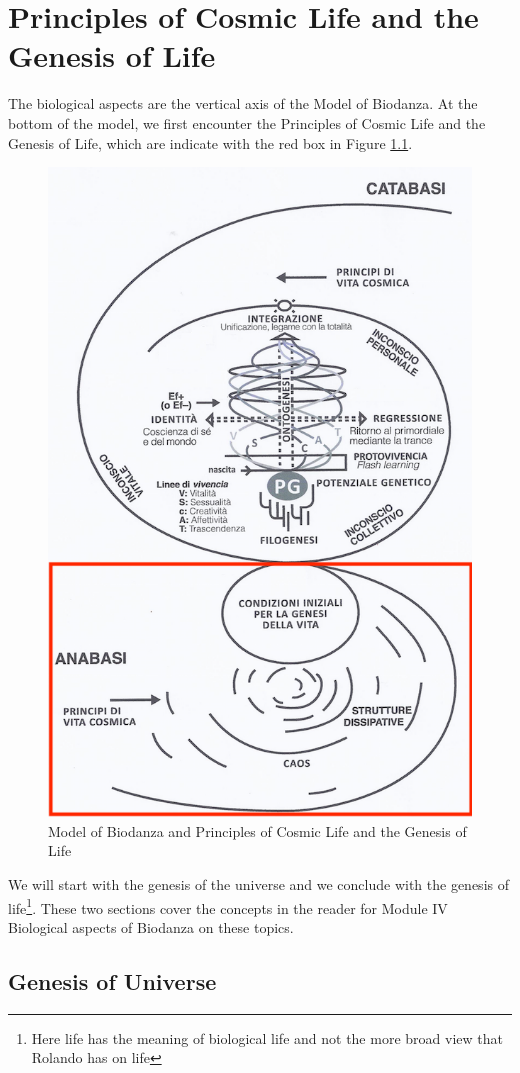 \documentclass[
  11pt,
]{book}
\begin{document}
\hypertarget{principles-of-cosmic-life-and-the-genesis-of-life}{%
\chapter{Principles of Cosmic Life and the Genesis of Life}\label{principles-of-cosmic-life-and-the-genesis-of-life}}

The biological aspects are the vertical axis of the Model of Biodanza.
At the bottom of the model, we first encounter the Principles of Cosmic Life and the Genesis of Life, which are indicate with the red box in Figure \ref{fig:modelCosmic}.

\begin{figure}

{\centering \includegraphics[width=0.5\linewidth]{./figs/biologischeAspectenBiodanzaDeelI} 

}

\caption{Model of Biodanza and Principles of Cosmic Life and the Genesis of Life}\label{fig:modelCosmic}
\end{figure}

We will start with the genesis of the universe and we conclude with the genesis of life\footnote{Here life has the meaning of biological life and not the more broad view that Rolando has on life}. These two sections cover the concepts in the reader for Module IV Biological aspects of Biodanza on these topics.

\hypertarget{genesis-of-universe}{%
\section{Genesis of Universe}\label{genesis-of-universe}}
\end{document}
